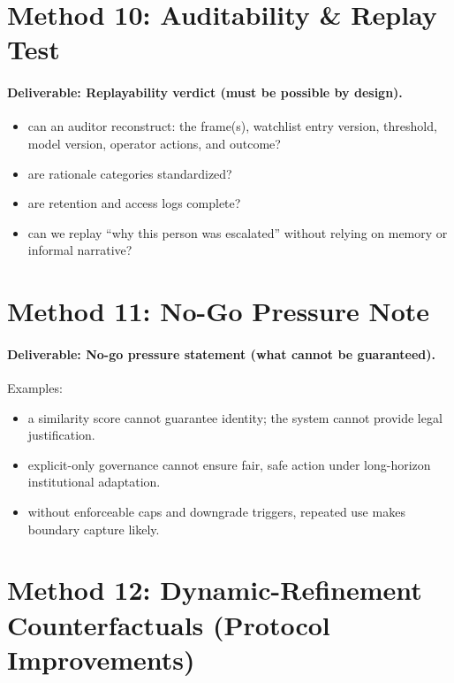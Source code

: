 \section{Method 10: Auditability \& Replay Test}
\label{sec:airport-m10}

\paragraph{Deliverable: Replayability verdict (must be possible by design).}

\begin{itemize}
  \item can an auditor reconstruct: the frame(s), watchlist entry version, threshold, model version,
        operator actions, and outcome?
  \item are rationale categories standardized?
  \item are retention and access logs complete?
  \item can we replay “why this person was escalated” without relying on memory or informal narrative?
\end{itemize}

\section{Method 11: No-Go Pressure Note}
\label{sec:airport-m11}

\paragraph{Deliverable: No-go pressure statement (what cannot be guaranteed).}

Examples:
\begin{itemize}
  \item a similarity score cannot guarantee identity; the system cannot provide legal justification.
  \item explicit-only governance cannot ensure fair, safe action under long-horizon institutional adaptation.
  \item without enforceable caps and downgrade triggers, repeated use makes boundary capture likely.
\end{itemize}

\section{Method 12: Dynamic-Refinement Counterfactuals (Protocol Improvements)}
\label{sec:airport-m12}

